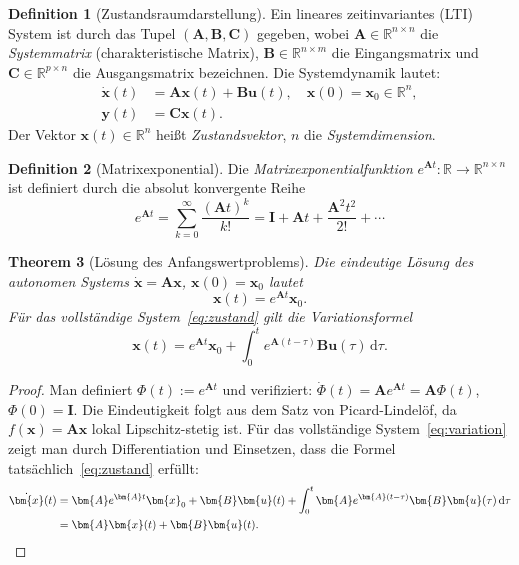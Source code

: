 \documentclass[a4paper, 12pt, twoside, openright]{report}
\newtheorem{theorem}{Theorem}[section]
\theoremstyle{definition}
\newtheorem{definition}[theorem]{Definition}
\theoremstyle{definition}
\newcommand{\R}{\mathbb{R}}
\newcommand{\vx}{\bm{x}}
\newcommand{\vu}{\bm{u}}
\newcommand{\vy}{\bm{y}}
\newcommand{\vA}{\bm{A}}
\newcommand{\vB}{\bm{B}}
\newcommand{\vC}{\bm{C}}
\newcommand{\vI}{\bm{I}}
\begin{document}
\begin{definition}[Zustandsraumdarstellung]
\label{def:zrd}
Ein lineares zeitinvariantes (LTI) System ist durch das Tupel $(\vA, \vB, \vC)$ gegeben,
wobei $\vA \in \R^{n \times n}$ die \emph{Systemmatrix} (charakteristische Matrix),
$\vB \in \R^{n \times m}$ die Eingangsmatrix und $\vC \in \R^{p \times n}$ die
Ausgangsmatrix bezeichnen. Die Systemdynamik lautet:
\begin{align}
  \dot{\vx}(t) &= \vA\vx(t) + \vB\vu(t), \quad \vx(0) = \vx_0 \in \R^n,
    \label{eq:zustand} \\
  \vy(t) &= \vC\vx(t). \label{eq:ausgang}
\end{align}
Der Vektor $\vx(t) \in \R^n$ heißt \emph{Zustandsvektor}, $n$ die
\emph{Systemdimension}.
\end{definition}

\begin{definition}[Matrixexponential]
\label{def:matexp}
Die \emph{Matrixexponentialfunktion} $e^{\vA t} : \R \to \R^{n \times n}$ ist definiert
durch die absolut konvergente Reihe
\begin{equation}
  e^{\vA t} = \sum_{k=0}^{\infty} \frac{(\vA t)^k}{k!} = \vI + \vA t + \frac{\vA^2 t^2}{2!} + \cdots
  \label{eq:matexp}
\end{equation}
\end{definition}

\begin{theorem}[Lösung des Anfangswertproblems]
\label{thm:loesung}
Die eindeutige Lösung des autonomen Systems $\dot{\vx} = \vA\vx$,
$\vx(0) = \vx_0$ lautet
\begin{equation}
  \vx(t) = e^{\vA t}\vx_0.
  \label{eq:loesung}
\end{equation}
Für das vollständige System~\eqref{eq:zustand} gilt die Variationsformel
\begin{equation}
  \vx(t) = e^{\vA t}\vx_0 + \int_0^t e^{\vA(t-\tau)}\vB\vu(\tau)\,\mathrm{d}\tau.
  \label{eq:variation}
\end{equation}
\end{theorem}

\begin{proof}
Man definiert $\Phi(t) := e^{\vA t}$ und verifiziert:
$\dot{\Phi}(t) = \vA e^{\vA t} = \vA\Phi(t)$, $\Phi(0) = \vI$.
Die Eindeutigkeit folgt aus dem Satz von Picard-Lindelöf, da $f(\vx) = \vA\vx$ lokal
Lipschitz-stetig ist. Für das vollständige System~\eqref{eq:variation} zeigt man
durch Differentiation und Einsetzen, dass die Formel tatsächlich~\eqref{eq:zustand}
erfüllt:
\begin{align*}
  \dot{\vx}(t) &= \vA e^{\vA t}\vx_0 + \vB\vu(t) + \int_0^t \vA e^{\vA(t-\tau)}\vB\vu(\tau)\,\mathrm{d}\tau \\
               &= \vA\vx(t) + \vB\vu(t). \qedhere
\end{align*}
\end{proof}
\end{document}
